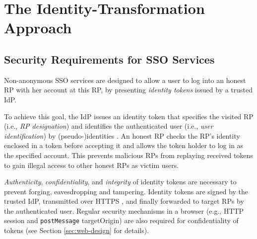 \section{The Identity-Transformation Approach}
\label{sec:challenge}


\subsection{Security Requirements for SSO Services}
\label{subsec:basicrequirements}

Non-anonymous SSO services \cite{OpenIDConnect,rfc6749,SAML,SAMLIdentifier,NIST2017draft} are designed to allow a user to log into an honest RP with her account at this RP, %
by presenting \emph{identity tokens} issued by a trusted IdP.

To achieve this goal, the IdP issues an identity token that specifies the visited RP (i.e., \emph{RP designation}) and identifies the authenticated user (i.e., \emph{user identification})
        by (pseudo-)identities \cite{OpenIDConnect,rfc6749,SAML}.
An honest RP checks the RP's identity enclosed in a token before accepting it and allows the token holder to log in as the specified account. This prevents malicious RPs from replaying received tokens to gain illegal access to other honest RPs as victim users.

\emph{Authenticity}, \emph{confidentiality}, and \emph{integrity} of identity tokens are necessary to prevent forging, eavesdropping and tampering.
Identity tokens are signed by the trusted IdP,
    transmitted over HTTPS \cite{OpenIDConnect, rfc6749, SAML},
    and finally forwarded to target RPs by the authenticated user.
Regular security mechanisms in a browser (e.g., HTTP session and \verb+postMessage+ targetOrigin)
are also required for confidentiality of tokens \cite{GoogleIdIntegrate,de2014oauth,FettKS14,BrowserID} (see Section \ref{sec:web-design} for details).


